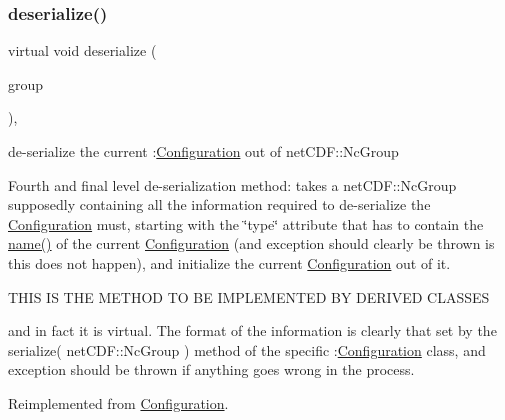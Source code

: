 \subsubsection{\texorpdfstring{deserialize()}{deserialize()}}
{\footnotesize\ttfamily virtual void deserialize (\begin{DoxyParamCaption}\item[{net\+C\+D\+F\+::\+Nc\+Group \&\&}]{group }\end{DoxyParamCaption})\hspace{0.3cm}{\ttfamily [override]}, {\ttfamily [virtual]}}



de-\/serialize the current \+:\mbox{\hyperlink{class_s_m_spp__di__unipi__it_1_1_configuration}{Configuration}} out of net\+C\+D\+F\+::\+Nc\+Group 

Fourth and final level de-\/serialization method\+: takes a net\+C\+D\+F\+::\+Nc\+Group supposedly containing all the information required to de-\/serialize the \mbox{\hyperlink{class_s_m_spp__di__unipi__it_1_1_configuration}{Configuration}} must, starting with the \char`\"{}type\char`\"{} attribute that has to contain the \mbox{\hyperlink{class_s_m_spp__di__unipi__it_1_1_configuration_a738e9dfd6e00507da219e4bd5a3f6be9}{name()}} of the current \mbox{\hyperlink{class_s_m_spp__di__unipi__it_1_1_configuration}{Configuration}} (and exception should clearly be thrown is this does not happen), and initialize the current \mbox{\hyperlink{class_s_m_spp__di__unipi__it_1_1_configuration}{Configuration}} out of it. \begin{DoxyVerb} THIS IS THE METHOD TO BE IMPLEMENTED BY DERIVED CLASSES
\end{DoxyVerb}


and in fact it is virtual. The format of the information is clearly that set by the serialize( net\+C\+D\+F\+::\+Nc\+Group ) method of the specific \+:\mbox{\hyperlink{class_s_m_spp__di__unipi__it_1_1_configuration}{Configuration}} class, and exception should be thrown if anything goes wrong in the process. 

Reimplemented from \mbox{\hyperlink{class_s_m_spp__di__unipi__it_1_1_configuration_af03cd244e01fc59411ed4fcd6bd92949}{Configuration}}.

\mbox{\label{class_s_m_spp__di__unipi__it_1_1_simple_configuration_a019850055afe817b816bae5699f461d3}} 
